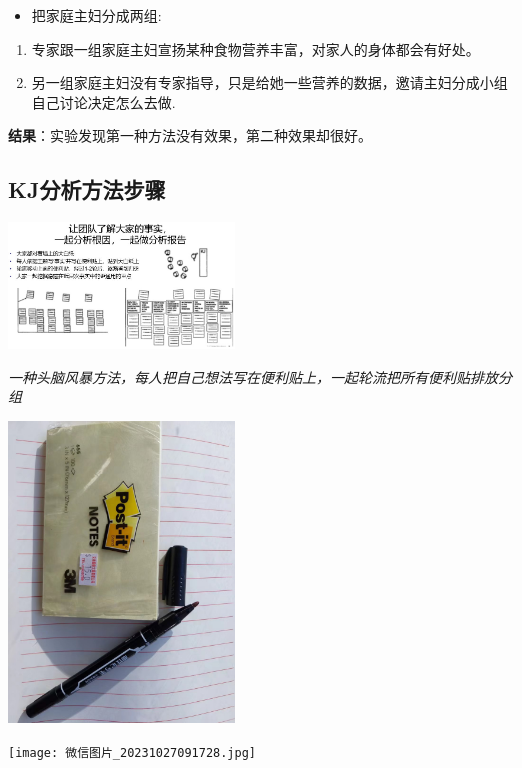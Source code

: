 \begin{itemize}
\tightlist
\item
  把家庭主妇分成两组:
\end{itemize}

\begin{enumerate}
\tightlist
\item
  专家跟一组家庭主妇宣扬某种食物营养丰富，对家人的身体都会有好处。
\item
  另一组家庭主妇没有专家指导，只是给她一些营养的数据，邀请主妇分成小组自己讨论决定怎么去做.\\
\end{enumerate}

\textbf{结果}：实验发现第一种方法没有效果，第二种效果却很好。

\hypertarget{kjux5206ux6790ux65b9ux6cd5ux6b65ux9aa4}{%
\subsection{KJ分析方法步骤}\label{kjux5206ux6790ux65b9ux6cd5ux6b65ux9aa4}}

\includegraphics[width=6cm]{Kj1Screenshot2023-11-01133052.jpg}

\emph{一种头脑风暴方法，每人把自己想法写在便利贴上，一起轮流把所有便利贴排放分组}

\includegraphics[width=6cm]{微信图片_20231027091622.jpg}

\texttt{[image: 微信图片\_20231027091728.jpg]}

